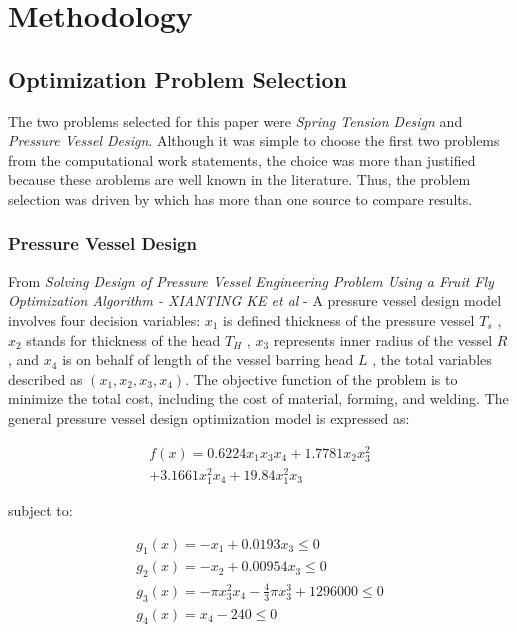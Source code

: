 \documentclass[conference]{IEEEtran}
\begin{document}
\section{Methodology}
\label{sec:methodology}

\subsection{Optimization Problem Selection}
\label{subsec:optimization-problem-selection}
The two problems selected for this paper were \textit{Spring Tension Design} and \textit{Pressure Vessel Design}. Although it was simple
to choose the first two problems from the computational work statements, the choice was more than justified because these aroblems are well
known in the literature.
Thus, the problem selection was driven by which has more than one source to compare results.

\subsubsection{Pressure Vessel Design}
\label{subsubsec:methodology-pressure-vessel-design}
From \textit{Solving Design of Pressure Vessel Engineering
Problem Using a Fruit Fly Optimization Algorithm - XIANTING KE et al} -
A pressure vessel design model involves four decision variables: $x_1$ is defined
thickness of the pressure vessel $T_s$ , $x_2$ stands for
thickness of the head $T_H$ , $x_3$ represents inner radius of the
vessel $R$ , and $x_4$ is on behalf of length of the vessel
barring head $L$ , the total variables described as $( x_1 , x_2 , x_3 , x_4 )$.
The objective function of the problem is to minimize the total cost, including
the cost of material, forming, and welding.
The general pressure vessel design optimization model is expressed as:

\begin{equation}
	\begin{split}
        f(x) = 0.6224 x_1 x_3 x_4 + 1.7781 x_2 x_3^2 \\
        + 3.1661 x_1^2 x_4 + 19.84 x_1^2 x_3
	\end{split}
\end{equation}

subject to:

\begin{equation}
    \begin{split}
        g_1(x) = - x_1 + 0.0193 x_3 \leq 0\\
        g_2(x) = - x_2 + 0.00954 x_3 \leq 0\\
        g_3(x) = - \pi x_3^2 x_4 -\frac{4}{3}\pi x_3^3 + 1296000 \leq 0\\
        g_4(x) = x_4 -240 \leq 0\\
    \end{split}
\end{equation}
\end{document}
